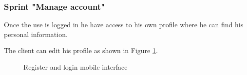\documentclass[12pt,a4paper]{report}
\begin{document}
\subsubsection*{Sprint "Manage account"}
Once the use is logged in he have access to his own profile where he can find his personal information.\par
The client can edit his profile as shown in Figure \ref{manageaccount-label}.
\begin{figure}[H]
	\centering
	\vspace*{1in}
	\qquad
	\caption{Register and login mobile interface}%
	\label{manageaccount-label}%
\end{figure}
\end{document}
